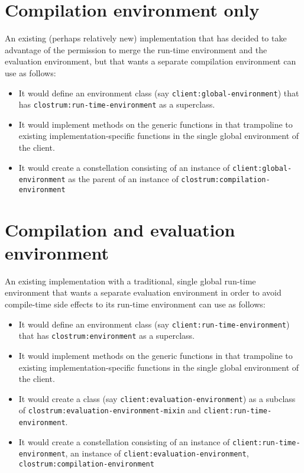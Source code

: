 \section{Compilation environment only}

An existing (perhaps relatively new) \commonlisp{} implementation that
has decided to take advantage of the permission to merge the run-time
environment and the evaluation environment, but that wants a separate
compilation environment can use \sysname{} as follows:

\begin{itemize}
\item It would define an environment class  (say
  \texttt{client:global-environment}) that has
  \texttt{clostrum:run-time-environment} as a superclass.
\item It would implement methods on the generic functions in
   that trampoline to existing
  implementation-specific functions in the single global environment
  of the client.
\item It would create a constellation consisting of an instance of
  \texttt{client:global-environment} as the parent of an instance of
  \texttt{clostrum:compilation-environment}
\end{itemize}

\section{Compilation and evaluation environment}

An existing \commonlisp{} implementation with a traditional, single
global run-time environment that wants a separate evaluation
environment in order to avoid compile-time side effects to its
run-time environment can use \sysname{} as follows:

\begin{itemize}
\item It would define an environment class  (say
  \texttt{client:run-time-environment}) that has
  \texttt{clostrum:environment} as a superclass.
\item It would implement methods on the generic functions in
   that trampoline to existing
  implementation-specific functions in the single global environment
  of the client.
\item It would create a class (say
  \texttt{client:evaluation-environment}) as a subclass of
  \texttt{clostrum:evaluation-environment-mixin} and
  \texttt{client:run-time-environment}.
\item It would create a constellation consisting of an instance of
  \texttt{client:run-time-environment}, an instance of
  \texttt{client:evaluation-environment},
  \texttt{clostrum:compilation-environment}
\end{itemize}
